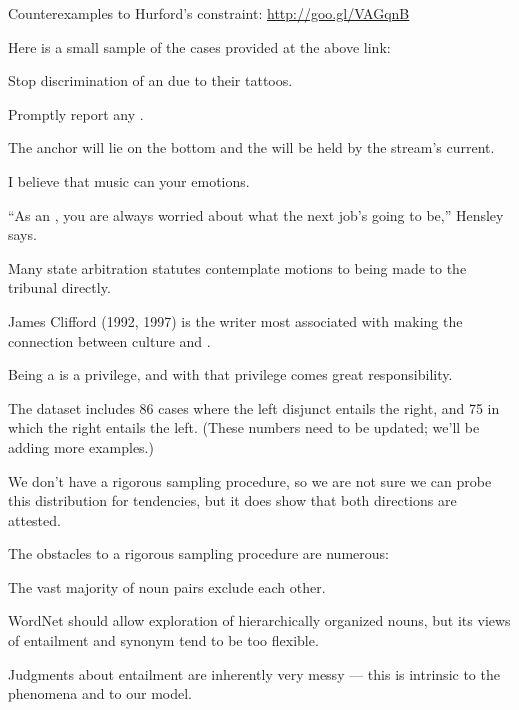 \documentclass{article}
\begin{document}
\begin{examples}
\item\label{ourcorpus} Counterexamples to Hurford's constraint:
  \url{http://goo.gl/VAGqnB}

\item Here is a small sample of the cases provided at the above link:

  \begin{examples}
  \item Stop discrimination of an  due to their tattoos.
  \item Promptly report any .
  \item The anchor will lie on the bottom and the  will be held by the stream's current.
  \item I believe that music can  your emotions.
  \item ``As an , you are always worried about what the next job's going to be,'' Hensley says.
  \item Many state arbitration statutes contemplate motions to  being made to the tribunal directly.
  \item James Clifford (1992, 1997) is the writer most associated with making the connection between culture and .
  \item Being a  is a privilege, and with that privilege comes great responsibility.
  \end{examples}

\item The dataset includes 86 cases where the left disjunct entails
  the right, and 75 in which the right entails the left. (These
  numbers need to be updated; we'll be adding more examples.)

\item We don't have a rigorous sampling procedure, so we are not sure
  we can probe this distribution for tendencies, but it does show that
  both directions are attested.


\item The obstacles to a rigorous sampling procedure are numerous:   
  \begin{examples}
  \item The vast majority of noun pairs exclude each other.
  \item WordNet should allow exploration of hierarchically organized
    nouns, but its views of entailment and synonym tend to be too
    flexible.
  \item Judgments about entailment are inherently very messy --- this
    is intrinsic to the phenomena and to our model.
  \end{examples}


\end{examples}
\end{document}
